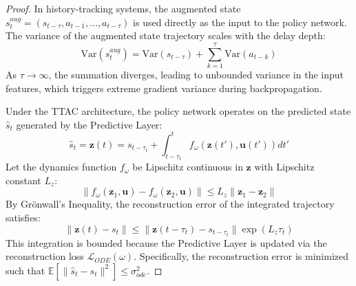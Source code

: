 \documentclass[manuscript, screen, review]{jair}
\begin{document}
\begin{proof}
In history-tracking systems, the augmented state $s^{aug}_t = (s_{t-\tau}, a_{t-1}, \dots, a_{t-\tau})$ is used directly as the input to the policy network. The variance of the augmented state trajectory scales with the delay depth:
\begin{equation*}
    \text{Var}(s^{aug}_t) = \text{Var}(s_{t-\tau}) + \sum_{k=1}^{\tau} \text{Var}(a_{t-k})
\end{equation*}
As $\tau \to \infty$, the summation diverges, leading to unbounded variance in the input features, which triggers extreme gradient variance during backpropagation.

Under the TTAC architecture, the policy network operates on the predicted state $\hat{s}_t$ generated by the Predictive Layer:
\begin{equation*}
    \hat{s}_t = \mathbf{z}(t) = s_{t-\tau_t} + \int_{t-\tau_t}^{t} f_\omega(\mathbf{z}(t'), \mathbf{u}(t')) dt'
\end{equation*}
Let the dynamics function $f_\omega$ be Lipschitz continuous in $\mathbf{z}$ with Lipschitz constant $L_z$:
\begin{equation*}
    \| f_\omega(\mathbf{z}_1, \mathbf{u}) - f_\omega(\mathbf{z}_2, \mathbf{u}) \| \le L_z \| \mathbf{z}_1 - \mathbf{z}_2 \|
\end{equation*}
By Grönwall's Inequality, the reconstruction error of the integrated trajectory satisfies:
\begin{equation*}
    \| \mathbf{z}(t) - s_t \| \le \| \mathbf{z}(t-\tau_t) - s_{t-\tau_t} \| \exp(L_z \tau_t)
\end{equation*}
This integration is bounded because the Predictive Layer is updated via the reconstruction loss $\mathcal{L}_{ODE}(\omega)$. Specifically, the reconstruction error is minimized such that $\mathbb{E} [\| \hat{s}_t - s_t \|^2] \le \sigma_{ode}^2$.


\end{proof}
\end{document}

